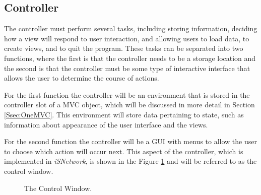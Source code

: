 \documentclass{article}[11pt]
\newcommand{\Rpackage}[1]{{\textit{#1}}}
\begin{document}
\subsection{Controller}\label{Ssec:OneCont}

The controller must perform several tasks, including storing information,
deciding how a view will respond to user interaction, and allowing users to
load data, to create views, and to quit the program.  These tasks can be
separated into two functions, where the first is that the controller needs to
be a storage location and the second is that the controller must be some type
of interactive interface that allows the user to determine the course of
actions.  

For the first function the controller will be an environment that is
stored in the controller slot of a MVC object, which will be discussed in more
detail in Section \ref{Ssec:OneMVC}.  This environment will store data
pertaining to state, such as information about appearance of the user interface
and the views.

For the second function the controller will be a GUI with menus to
allow the user to choose which action will occur next.  This aspect of the
controller, which is implemented in \Rpackage{iSNetwork}, is shown in the
Figure \ref{Fig:ContWin} and will be referred to as the control window. 

\begin{figure}[ht]
  \begin{center}
    \caption{ The Control Window. }
    \label{Fig:ContWin}
  \end{center}
\end{figure}
\end{document}
